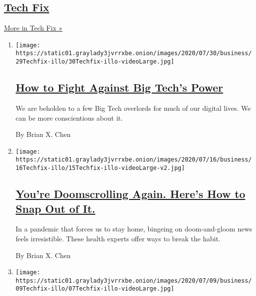 \hypertarget{tech-fix}{%
\subsection{\texorpdfstring{\href{/column/tech-fix}{Tech
Fix}}{Tech Fix}}\label{tech-fix}}

\href{/column/tech-fix}{More in Tech Fix »}

\begin{enumerate}
\def\labelenumi{\arabic{enumi}.}
\item
  \texttt{[image: https://static01.graylady3jvrrxbe.onion/images/2020/07/30/business/29Techfix-illo/30Techfix-illo-videoLarge.jpg]}

  \hypertarget{how-to-fight-against-big-techs-power}{%
  \subsection{\texorpdfstring{\href{/2020/07/29/technology/personaltech/big-tech-power-how-to-fight.html}{How
  to Fight Against Big Tech's
  Power}}{How to Fight Against Big Tech's Power}}\label{how-to-fight-against-big-techs-power}}

  We are beholden to a few Big Tech overlords for much of our digital
  lives. We can be more conscientious about it.

  By Brian X. Chen
\item
  \texttt{[image: https://static01.graylady3jvrrxbe.onion/images/2020/07/16/business/16Techfix-illo/15Techfix-illo-videoLarge-v2.jpg]}

  \hypertarget{youre-doomscrolling-again-heres-how-to-snap-out-of-it}{%
  \subsection{\texorpdfstring{\href{/2020/07/15/technology/personaltech/youre-doomscrolling-again-heres-how-to-snap-out-of-it.html}{You're
  Doomscrolling Again. Here's How to Snap Out of
  It.}}{You're Doomscrolling Again. Here's How to Snap Out of It.}}\label{youre-doomscrolling-again-heres-how-to-snap-out-of-it}}

  In a pandemic that forces us to stay home, bingeing on doom-and-gloom
  news feels irresistible. These health experts offer ways to break the
  habit.

  By Brian X. Chen
\item
  \texttt{[image: https://static01.graylady3jvrrxbe.onion/images/2020/07/09/business/09Techfix-illo/07Techfix-illo-videoLarge.jpg]}


\end{enumerate}
